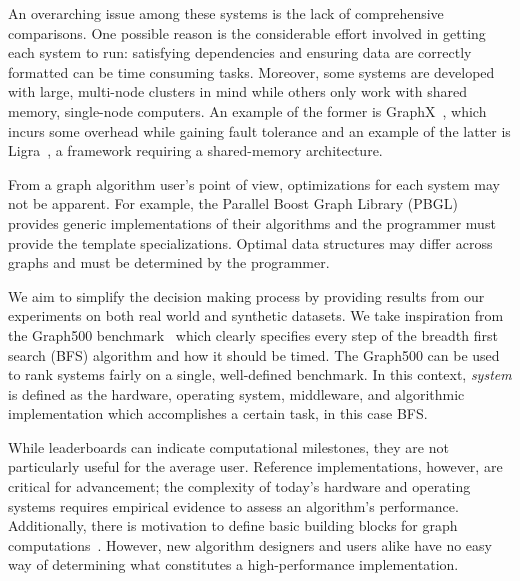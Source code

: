 \documentclass[conference]{IEEEtran}
\begin{document}
An overarching issue among these systems is the lack of comprehensive comparisons. One possible reason is the considerable effort involved in getting each system to run: satisfying dependencies and ensuring data are correctly formatted can be time consuming tasks. Moreover, some systems are developed with large, multi-node clusters in mind while others only work with shared memory, single-node computers. An example of the former is GraphX~\cite{Xin:2013:GraphX}, which incurs some overhead while gaining fault tolerance and an example of the latter is Ligra~\cite{Shun:2013:Ligra}, a framework requiring a shared-memory architecture.

From a graph algorithm user's point of view, optimizations for each system may not be apparent. For example, the Parallel Boost Graph Library (PBGL)~\cite{Gregor:2005:PBGL} provides generic implementations of their algorithms and the programmer must provide the template specializations. Optimal data structures may differ across graphs and must be determined by the programmer.

We aim to simplify the decision making process by providing results from our experiments on both real world and synthetic datasets. We take inspiration from the Graph500 benchmark~\cite{Murphy:2010:Graph500} which clearly specifies every step of the breadth first search (BFS) algorithm and how it should be timed. The Graph500 can be used to rank systems fairly on a single, well-defined benchmark. In this context, \emph{system} is defined as the hardware, operating system, middleware, and algorithmic implementation which accomplishes a certain task, in this case BFS.

While leaderboards can indicate computational milestones, they are not particularly useful for the average user. Reference implementations, however, are critical for advancement; the complexity of today's hardware and operating systems requires empirical evidence to assess an algorithm's performance. Additionally, there is motivation to define basic building blocks for graph computations~\cite{GABB16, Buluc:CombBLAS:2011}. However, new algorithm designers and users alike have no easy way of determining what constitutes a high-performance implementation.
\end{document}
